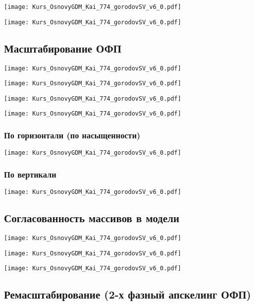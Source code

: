 \documentclass[main.tex]{subfiles}
\begin{document}
\texttt{[image: Kurs\_OsnovyGDM\_Kai\_774\_gorodovSV\_v6\_0.pdf]}

\texttt{[image: Kurs\_OsnovyGDM\_Kai\_774\_gorodovSV\_v6\_0.pdf]}

\subsection{Масштабирование ОФП}

\texttt{[image: Kurs\_OsnovyGDM\_Kai\_774\_gorodovSV\_v6\_0.pdf]}

\texttt{[image: Kurs\_OsnovyGDM\_Kai\_774\_gorodovSV\_v6\_0.pdf]}

\texttt{[image: Kurs\_OsnovyGDM\_Kai\_774\_gorodovSV\_v6\_0.pdf]}

\texttt{[image: Kurs\_OsnovyGDM\_Kai\_774\_gorodovSV\_v6\_0.pdf]}

\subsubsection{По горизонтали (по насыщенности)}

\texttt{[image: Kurs\_OsnovyGDM\_Kai\_774\_gorodovSV\_v6\_0.pdf]}

\subsubsection{По вертикали}

\texttt{[image: Kurs\_OsnovyGDM\_Kai\_774\_gorodovSV\_v6\_0.pdf]}

\subsection{Согласованность массивов в модели}

\texttt{[image: Kurs\_OsnovyGDM\_Kai\_774\_gorodovSV\_v6\_0.pdf]}

\texttt{[image: Kurs\_OsnovyGDM\_Kai\_774\_gorodovSV\_v6\_0.pdf]}

\texttt{[image: Kurs\_OsnovyGDM\_Kai\_774\_gorodovSV\_v6\_0.pdf]}

\subsection{Ремасштабирование (2-х фазный апскелинг ОФП)}
\end{document}
